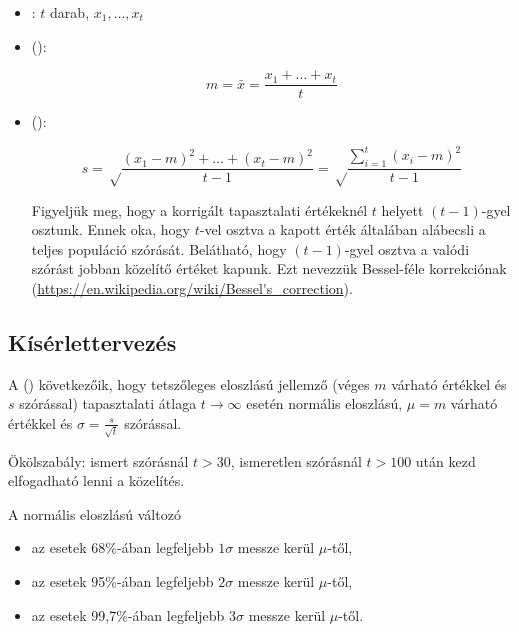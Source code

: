 \begin{definicio}
	\begin{itemize}
		\item {}: $t$ darab, $x_1, \dots, x_t$
		\item {} ():
		
		$$m = \bar{x} = \frac{x_1 + \dots + x_t}{t}$$
		
		\item {} ():
		
		$$s = \sqrt\frac{\left(x_1-m\right)^2 + \dots + \left(x_t-m\right)^2}{t-1} = \sqrt\frac{\sum_{i=1}^{t}\left(x_i - m\right)^2}{t-1}$$
		
		Figyeljük meg, hogy a korrigált tapasztalati értékeknél $t$ helyett $(t-1)$-gyel osztunk. Ennek oka, hogy $t$-vel osztva a kapott érték általában alábecsli a teljes populáció szórását. Belátható, hogy $(t-1)$-gyel osztva a valódi szórást jobban közelítő értéket kapunk. Ezt nevezzük Bessel-féle korrekciónak (\url{https://en.wikipedia.org/wiki/Bessel's\_correction}).
	\end{itemize}
\end{definicio}

\subsection{Kísérlettervezés}

A  () következőik, hogy tetszőleges eloszlású jellemző (véges $m$ várható értékkel és $s$ szórással) tapasztalati átlaga $t \rightarrow \infty$ esetén normális eloszlású, $\mu = m$ várható értékkel és $\sigma = \frac{s}{\sqrt{t}}$ szórással.

Ökölszabály: ismert szórásnál $t > 30$, ismeretlen szórásnál $t > 100$ után kezd elfogadható lenni a közelítés.

A normális eloszlású változó
\begin{itemize}
	\item az esetek 68\%-ában legfeljebb $1\sigma$ messze kerül $\mu$-től,
	\item az esetek 95\%-ában legfeljebb $2\sigma$ messze kerül $\mu$-től,
	\item az esetek 99,7\%-ában legfeljebb $3\sigma$ messze kerül $\mu$-től.
\end{itemize}

